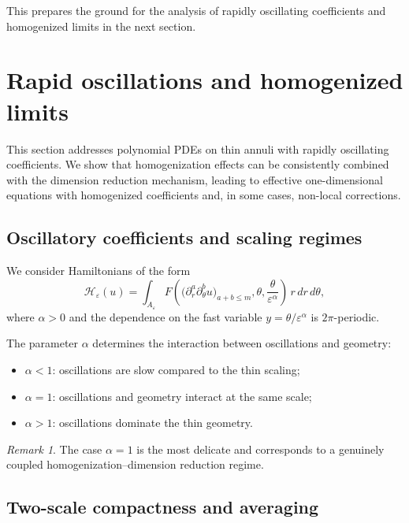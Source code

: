 \documentclass[11pt]{amsart}
\theoremstyle{plain}
\theoremstyle{definition}
\theoremstyle{remark}
\newtheorem{remark}[theorem]{Remark}
\theoremstyle{remark}
\begin{document}
This prepares the ground for the analysis of rapidly oscillating coefficients
and homogenized limits in the next section.

\section{Rapid oscillations and homogenized limits}
\label{sec:homogenization}

This section addresses polynomial PDEs on thin annuli with rapidly oscillating
coefficients.
We show that homogenization effects can be consistently combined with the
dimension reduction mechanism, leading to effective one-dimensional equations
with homogenized coefficients and, in some cases, non-local corrections.

\subsection{Oscillatory coefficients and scaling regimes}

We consider Hamiltonians of the form
\[
\mathcal H_\varepsilon(u)
=
\int_{A_\varepsilon}
F\!\left(
\bigl(\partial_r^a\partial_\theta^b u\bigr)_{a+b\le m},
\theta,\frac{\theta}{\varepsilon^\alpha}
\right)
\,r\,dr\,d\theta,
\]
where $\alpha>0$ and the dependence on the fast variable
$y=\theta/\varepsilon^\alpha$ is $2\pi$-periodic.

The parameter $\alpha$ determines the interaction between oscillations and
geometry:
\begin{itemize}
\item $\alpha<1$: oscillations are slow compared to the thin scaling;
\item $\alpha=1$: oscillations and geometry interact at the same scale;
\item $\alpha>1$: oscillations dominate the thin geometry.
\end{itemize}

\begin{remark}
The case $\alpha=1$ is the most delicate and corresponds to a genuinely coupled
homogenization--dimension reduction regime.
\end{remark}

\subsection{Two-scale compactness and averaging}
\end{document}
